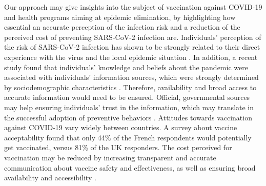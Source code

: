 Our approach may give insights into the subject of vaccination against COVID-19 and health programs aiming at epidemic elimination, by highlighting how essential an accurate perception of the infection risk and a reduction of the perceived cost of preventing SARS-CoV-2 infection are. Individuals' perception of the risk of SARS-CoV-2 infection has shown to be strongly related to their direct experience with the virus and the local epidemic situation \cite[]{Mansilla2020,Elharake2021}. In addition, a recent study found that individuals' knowledge and beliefs about the pandemic were associated with individuals' information sources, which were strongly determined by sociodemographic characteristics \cite[]{Ali2020}. Therefore, availability and broad access to accurate information would need to be ensured. Official, governmental sources may help ensuring individuals' trust in the information, which may translate in the successful adoption of preventive behaviors \cite[]{Lim2020}. Attitudes towards vaccination against COVID-19 vary widely between countries. A survey about vaccine acceptability \cite[]{Wuoters2021} found that only 44\% of the French respondents would potentially get vaccinated, versus 81\% of the UK responders. The cost perceived for vaccination may be reduced by increasing transparent and accurate communication about vaccine safety and effectiveness, as well as ensuring broad availability and accessibility \cite[]{Wuoters2021}. 

%

